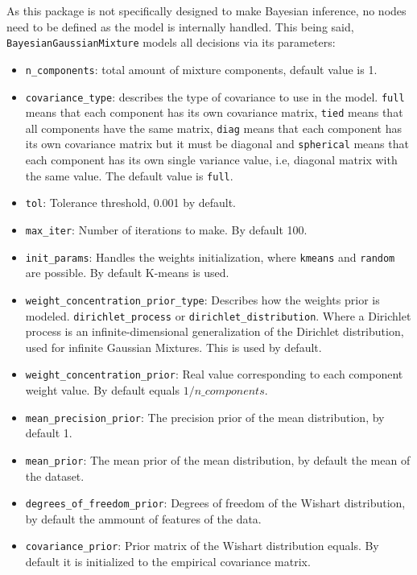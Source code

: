 As this package is not specifically designed to make Bayesian inference, no nodes need to be defined as the model is internally handled. This being said, \texttt{BayesianGaussianMixture} models all decisions via its parameters:
\begin{itemize}
  \item \texttt{n\_components}: total amount of mixture components, default value is 1.
  \item \texttt{covariance\_type}: describes the type of covariance to use in the model. \texttt{full} means that each component has its own covariance matrix, \texttt{tied} means that all components have the same matrix, \texttt{diag} means that each component has its own covariance matrix but it must be diagonal and \texttt{spherical} means that each component has its own single variance value, i.e, diagonal matrix with the same value. The default value is \texttt{full}.
  \item \texttt{tol}: Tolerance threshold, 0.001 by default.
  \item \texttt{max\_iter}: Number of iterations to make. By default 100.
  \item \texttt{init\_params}: Handles the weights initialization, where \texttt{kmeans} and \texttt{random} are possible. By default K-means is used.
  \item \texttt{weight\_concentration\_prior\_type}: Describes how the weights prior is modeled. \texttt{dirichlet\_process} or \texttt{dirichlet\_distribution}. Where a Dirichlet process is an infinite-dimensional generalization of the Dirichlet distribution, used for infinite Gaussian Mixtures. This is used by default.
  \item \texttt{weight\_concentration\_prior}: Real value corresponding to each component weight value. By default equals \(1/n\_components\).
  \item \texttt{mean\_precision\_prior}: The precision prior of the mean distribution, by default 1.
  \item \texttt{mean\_prior}: The mean prior of the mean distribution, by default the mean of the dataset.
  \item \texttt{degrees\_of\_freedom\_prior}: Degrees of freedom of the Wishart distribution, by default the ammount of features of the data.
  \item \texttt{covariance\_prior}: Prior matrix of the Wishart distribution equals. By default it is initialized to the empirical covariance matrix.
\end{itemize}

